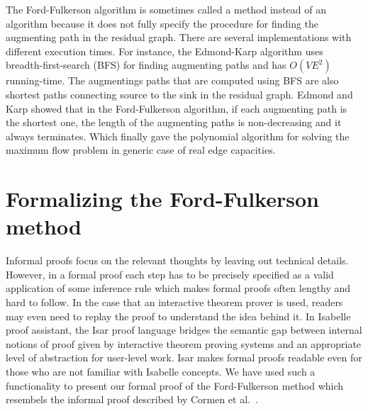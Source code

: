 \documentclass{llncs}
\begin{document}
The Ford-Fulkerson algorithm is sometimes called a method instead of an algorithm because it does not fully specify the procedure for finding the augmenting path in the residual graph. There are several implementations with different execution times. For instance, the Edmond-Karp algorithm uses breadth-first-search (BFS) for finding augmenting paths and has $O (VE^2)$ running-time. The augmentings paths that are computed using BFS are also shortest paths connecting source to the sink in the residual graph. Edmond and Karp showed that in the Ford-Fulkerson algorithm, if each augmenting path is the shortest one, the length of the augmenting paths is non-decreasing and it always terminates. Which finally gave the polynomial algorithm for solving the maximum flow problem in generic case of real edge capacities.


\section{Formalizing the Ford-Fulkerson method}
%
%    
%      
%    
%    


Informal proofs focus on the relevant thoughts by leaving out technical details. However, in a formal proof each step has to be precisely specified as a valid application of some inference rule which makes formal proofs often lengthy and hard to follow. In the case that an interactive theorem prover is used, readers may even need to replay the proof to understand the idea behind it. In Isabelle proof assistant, the Isar proof language bridges the semantic gap between internal notions of proof given by interactive theorem proving systems and an appropriate level of abstraction for user-level work. Isar makes formal proofs readable even for those who are not familiar with Isabelle concepts. We have used such a functionality to present our formal proof of the Ford-Fulkerson method which resembels the informal proof described by Cormen et al.~\cite{CLRS09}.
\end{document}
